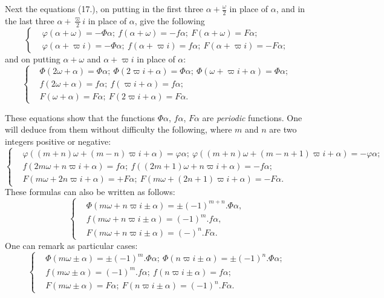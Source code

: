 \documentclass{article}
\begin{document}
Next the equations (17.), on putting in the first three $\alpha+\frac{\omega}{2}$ in place of $\alpha$, and in the last three $\alpha+\frac{\varpi}{2}i$ in place of $\alpha$, give the following
\[ \left\{\begin{aligned} &\varphi(\alpha+\omega)=-\Phi\alpha;\ f(\alpha+\omega)=-f\alpha;\ F(\alpha+\omega)=F\alpha;\\ &\varphi(\alpha+\varpi i)=-\Phi\alpha;\ f(\alpha+\varpi i)=f\alpha;\ F(\alpha+\varpi i)=-F\alpha; \end{aligned}\right. \tag{19.} \]
and on putting $\alpha+\omega$ and $\alpha+\varpi i$ in place of $\alpha$:
\[ \left\{\begin{aligned} &\Phi(2\omega+\alpha)=\Phi\alpha;\ \Phi(2\varpi i+\alpha)=\Phi\alpha;\ \Phi(\omega+\varpi i+\alpha)=\Phi\alpha;\\ &f(2\omega+\alpha)=f\alpha;\ f(\varpi i+\alpha)=f\alpha;\\ &F(\omega+\alpha)=F\alpha;\ F(2\varpi i+\alpha)=F\alpha. \end{aligned}\right. \tag{20.} \]

These equations show that the functions $\Phi\alpha$, $f\alpha$, $F\alpha$ are \emph{periodic} functions. One will deduce from them without difficulty the following, where $m$ and $n$ are two integers positive or negative:
\[ \left\{\begin{aligned} &\varphi((m+n)\omega+(m-n)\varpi i+\alpha)=\varphi\alpha;\ \varphi((m+n)\omega+(m-n+1)\varpi i+\alpha)=-\varphi\alpha;\\ &f(2m\omega+n\varpi i+\alpha)=f\alpha;\ f((2m+1)\omega+n\varpi i+\alpha)=-f\alpha;\\ &F(m\omega+2n\varpi i+\alpha)=+F\alpha;\ F(m\omega+(2n+1)\varpi i+\alpha)=-F\alpha. \end{aligned}\right. \tag{21.} \]
These formulas can also be written as follows:
\[ \left\{\begin{aligned} &\Phi(m\omega+n\varpi i\pm\alpha)=\pm(-1)^{m+n}.\Phi\alpha,\\ &f(m\omega+n\varpi i\pm\alpha)=(-1)^{m}.f\alpha,\\ &F(m\omega+n\varpi i\pm\alpha)=(-)^{n}.F\alpha. \end{aligned}\right. \tag{22.} \]
One can remark as particular cases:
\[ \left\{\begin{aligned} &\Phi(m\omega\pm\alpha)=\pm(-1)^{m}.\Phi\alpha;\ \Phi(n\varpi i\pm\alpha)=\pm(-1)^{n}.\Phi\alpha;\\ &f(m\omega\pm\alpha)=(-1)^{m}.f\alpha;\ f(n\varpi i\pm\alpha)=f\alpha;\\ &F(m\omega\pm\alpha)=F\alpha;\ F(n\varpi i\pm\alpha)=(-1)^{n}.F\alpha. \end{aligned}\right. \tag{22$'$.} \]
\end{document}
